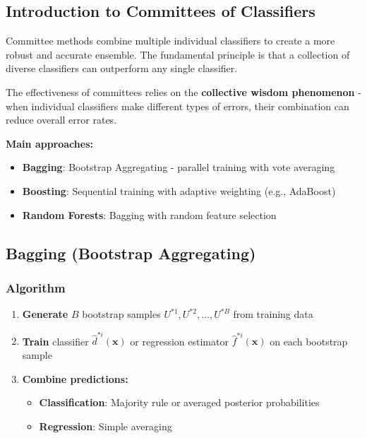 \documentclass[12pt,a4paper]{article}
\begin{document}
\subsection{Introduction to Committees of Classifiers}

Committee methods combine multiple individual classifiers to create a more robust and accurate ensemble. The fundamental principle is that a collection of diverse classifiers can outperform any single classifier.

\begin{tcolorbox}[colback=blue!5!white,colframe=blue!75!black,title=Core Principle]
The effectiveness of committees relies on the \textbf{collective wisdom phenomenon} - when individual classifiers make different types of errors, their combination can reduce overall error rates.
\end{tcolorbox}

\textbf{Main approaches:}
\begin{itemize}
    \item \textbf{Bagging}: Bootstrap Aggregating - parallel training with vote averaging
    \item \textbf{Boosting}: Sequential training with adaptive weighting (e.g., AdaBoost)
    \item \textbf{Random Forests}: Bagging with random feature selection
\end{itemize}

\subsection{Bagging (Bootstrap Aggregating)}

\subsubsection{Algorithm}

\begin{enumerate}
    \item \textbf{Generate} $B$ bootstrap samples $U^{*1}, U^{*2}, \ldots, U^{*B}$ from training data
    \item \textbf{Train} classifier $\hat{d}^{*i}(\mathbf{x})$ or regression estimator $\hat{f}^{*i}(\mathbf{x})$ on each bootstrap sample
    \item \textbf{Combine predictions:}
    \begin{itemize}
        \item \textbf{Classification}: Majority rule or averaged posterior probabilities
        \item \textbf{Regression}: Simple averaging
    \end{itemize}
\end{enumerate}
\end{document}
